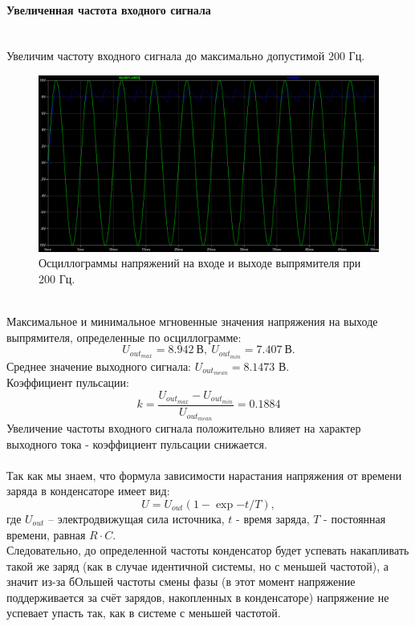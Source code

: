 \documentclass[12pt]{article}
\begin{document}
\paragraph*{Увеличенная частота входного сигнала}
\ \\
Увеличим частоту входного сигнала до максимально допустимой $200$ Гц.
\begin{figure}[H]
    \centering
    \includegraphics[width=\textwidth]{4_inc_voltage.png}
    \caption{Осциллограммы напряжений на входе и выходе выпрямителя при $200$ Гц.}
    \label{fig:4_inc_voltage.png}
\end{figure}\\
Максимальное и минимальное мгновенные значения напряжения на выходе выпрямителя, определенные по осциллограмме:
\[
U_{out_{max}} = 8.942 \ \text{В} , \ U_{out_{min}} = 7.407 \ \text{В}.
\]
Среднее значение выходного сигнала: $U_{{out}_{mean}} = 8.1473$ В.\\
Коэффициент пульсации:
\[
k = \frac{U_{out_{max}} - U_{out_{min}}}{U_{{out}_{mean}}} = 0.1884
\]
Увеличение частоты входного сигнала положительно влияет на характер выходного тока - коэффициент пульсации снижается.\\
\ \\
Так как мы знаем, что формула зависимости нарастания напряжения от времени заряда в конденсаторе имеет вид: 
\[
U = U_{out}(1 - \exp{-t/T}),
\]
где $U_{out}$ – электродвижущая сила источника, $t$ - время заряда, $T$ - постоянная времени, равная $R\cdot C$.\\
Следовательно, до определенной частоты конденсатор будет успевать накапливать такой же заряд (как в случае идентичной системы, но с меньшей частотой), а значит из-за бОльшей частоты смены фазы (в этот момент напряжение поддерживается за счёт зарядов, накопленных в конденсаторе) напряжение не успевает упасть так, как в системе с меньшей частотой.\\
\end{document}
